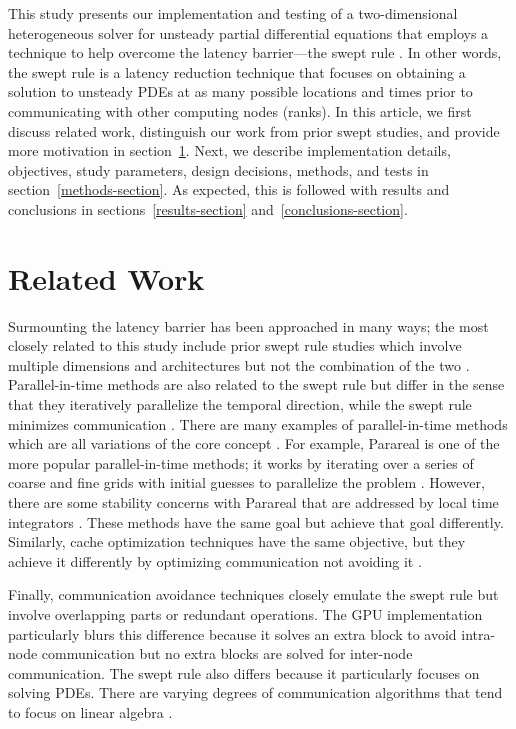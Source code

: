 \documentclass[preprints,article,accept,moreauthors,pdftex]{Definitions/mdpi}
\begin{document}
This study presents our implementation and testing of a two-dimensional heterogeneous solver for unsteady partial differential equations that employs a technique to help overcome the latency barrier---the swept rule \cite{Alhubail2016ThePDEs}. In other words, the swept rule is a latency reduction technique that focuses on obtaining a solution to unsteady PDEs at as many possible locations and times prior to communicating with other computing nodes (ranks). In this article, we first discuss related work, distinguish our work from prior swept studies, and provide more motivation in section~\ref{related-section}. Next, we describe implementation details, objectives, study parameters, design decisions, methods, and tests in section~\ref{methods-section}. As expected, this is followed with results and conclusions in sections~\ref{results-section} and~\ref{conclusions-section}.

\section{Related Work}
\label{related-section}
Surmounting the latency barrier has been approached in many ways; the most closely related to this study include prior swept rule studies which involve multiple dimensions and architectures but not the combination of the two \cite{Alhubail2016ThePDEs,Alhubail2018ThePDEs,Magee2018AcceleratingDecomposition,Magee2020ApplyingSystems}. Parallel-in-time methods are also related to the swept rule but differ in the sense that they iteratively parallelize the temporal direction, while the swept rule minimizes communication \cite{Gander201550Integration}. There are many examples of parallel-in-time methods which are all variations of the core concept \cite{Falgout2014ParallelMultigrid,Maday2020AnAlgorithm,Wu2018Parareal,EmmettTowardEquations,MinionINTERWEAVINGMULTIGRID,Hahne2020PyMGRIT:MGRIT}. For example, Parareal is one of the more popular parallel-in-time methods; it works by iterating over a series of coarse and fine grids with initial guesses to parallelize the problem \cite{Maday2020AnAlgorithm}. 
However, there are some stability concerns with Parareal that are addressed by local time integrators \cite{Wu2018Parareal}. These methods have the same goal but achieve that goal differently. Similarly, cache optimization techniques have the same objective, but they achieve it differently by optimizing communication not avoiding it \cite{Kowarschik2003AnAlgorithms}.

Finally, communication avoidance techniques closely emulate the swept rule but involve overlapping parts or redundant operations. The GPU implementation particularly blurs this difference because it solves an extra block to avoid intra-node communication but no extra blocks are solved for inter-node communication. The swept rule also differs because it particularly focuses on solving PDEs. There are varying degrees of communication algorithms that tend to focus on linear algebra \cite{DemmelAvoidingComputations, Ballard2011MinimizingAlgebra,BaboulinAMachines,Khabou2012LUVersion,SolomonikAHoefler}. 
\end{document}
